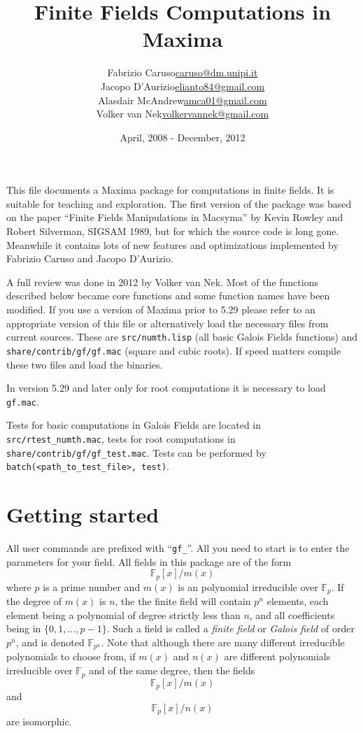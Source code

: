 \documentclass[a4paper,11pt,leqno,fleqn]{artikel3}
\title{Finite Fields Computations in Maxima}
\author{
\begin{tabular}{lr}  Fabrizio Caruso &  \url{caruso@dm.unipi.it} \\
 Jacopo D'Aurizio &  \url{elianto84@gmail.com} \\
 Alasdair McAndrew & \url{amca01@gmail.com}  \\
 Volker van Nek & \url{volkervannek@gmail.com} 
\end{tabular}
}
\date{April, 2008 - December, 2012}
\begin{document}
\maketitle


This file documents a Maxima package for computations in finite fields.  
It is suitable for teaching and exploration.
The first version of the package was based on the paper
``Finite Fields Manipulations in Macsyma'' by Kevin Rowley and Robert
Silverman, SIGSAM 1989, but for which the source code is long gone.
Meanwhile it contains lots of new features
and optimizations implemented by Fabrizio Caruso and Jacopo D'Aurizio.


A full review was done in 2012 by Volker van Nek. Most of the functions described below 
became core functions and some function names have been modified. 
If you use a version of Maxima prior to 5.29 please refer to an appropriate 
version of this file or alternatively load the necessary files from current sources. 
These are \texttt{src/numth.lisp} (all basic Galois Fields functions) 
and \texttt{share/contrib/gf/gf.mac} (square and cubic roots). 
If speed matters compile these two files and load the binaries.


In version 5.29 and later only for root computations it is necessary to 
load \texttt{gf.mac}. 


Tests for basic computations in Galois Fields are located in 
\texttt{src/rtest\_numth.mac}, tests for root computations in 
\texttt{share/contrib/gf/gf\_test.mac}. Tests can be performed by \\
\texttt{batch(<path\_to\_test\_file>, test)}.


\section*{Getting started}
All user commands are prefixed with ``\verb!gf_!''. All you need to start is
to enter the parameters for your field.  All fields in this package are of the
form
\[
\mathbb{F}_p[x]/{m(x)}
\]
where $p$ is a prime number and $m(x)$ is an polynomial irreducible over
$\mathbb{F}_p$.  If the degree of $m(x)$ is $n$, the the finite
field will contain $p^n$ elements, each element being a polynomial of degree
strictly less than $n$, and all coefficients being in $\{0,1,\ldots,p-1\}$.
Such a field is called a \emph{finite field} or \emph{Galois field} of order
$p^n$, and is denoted $\mathbb{F}_{p^n}$.  Note that although there are many different
irreducible polynomials to choose from, if $m(x)$ and $n(x)$ are different
polynomials irreducible over $\mathbb{F}_p$  and of the same degree,
then the fields 
\[
\mathbb{F}_p[x]/{m(x)}
\]
and
\[
\mathbb{F}_p[x]/{n(x)}
\]
are isomorphic.
\end{document}
